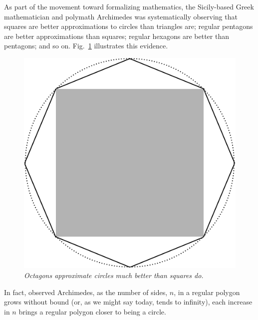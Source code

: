 
As part of the movement toward formalizing mathematics, the Sicily-based Greek mathematician and polymath Archimedes was systematically observing that squares are better approximations to circles than triangles are; regular pentagons are better approximations than squares; regular hexagons are better than pentagons; and so on.  Fig.~\ref{fig:approxcircle} illustrates this evidence.
\begin{figure}[htb]
\begin{center}
       \includegraphics[scale=0.25]{FiguresArithmetic/ApproxCircle}
\caption{{\it Octagons approximate circles much better than squares do.}
\label{fig:approxcircle}}
\end{center}
\end{figure}
In fact, observed Archimedes, as the number of sides, $n$, in a regular polygon grows without bound (or, as we might say today, tends to infinity), each increase in $n$ brings a regular polygon closer to being a circle.

\medskip


